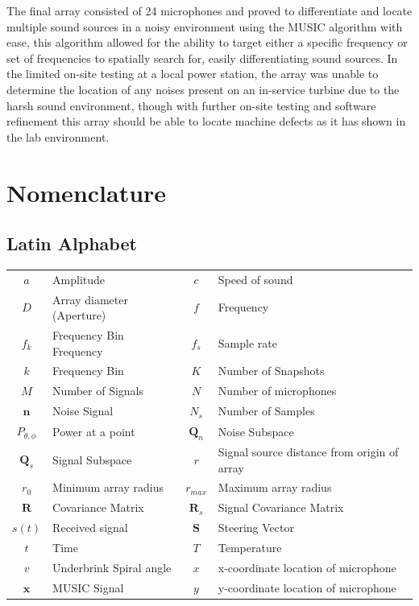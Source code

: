 \documentclass{UoNMCHA}
\numberwithin{equation}{section}
\begin{document}
    The final array consisted of 24 microphones and proved to differentiate and locate multiple sound sources in a noisy environment using the MUSIC algorithm with ease, this algorithm allowed for the ability to target either a specific frequency or set of frequencies to spatially search for, easily differentiating sound sources. In the limited on-site testing at a local power station, the array was unable to determine the location of any noises present on an in-service turbine due to the harsh sound environment, though with further on-site testing and software refinement this array should be able to locate machine defects as it has shown in the lab environment.

\singlespacing
\newpage
\tableofcontents
\newpage
\listoftables
\listoffigures
\newpage
\section*{Nomenclature}
\subsection*{Latin Alphabet}
    \begin{table}[H]
        \begin{tabular}{clcl}
            $a$&Amplitude&$c$&Speed of sound\\
            $D$&Array diameter (Aperture)&$f$&Frequency\\
            $f_k$&Frequency Bin Frequency&$f_s$&Sample rate\\
            $k$&Frequency Bin&$K$&Number of Snapshots\\
            $M$&Number of Signals&$N$&Number of microphones\\
            $\mathbf{n}$&Noise Signal&$N_s$&Number of Samples\\
            $P_{\theta,\phi}$&Power at a point&$\mathbf{Q}_n$&Noise Subspace\\
            $\mathbf{Q}_s$&Signal Subspace&$r$&Signal source distance from origin of array\\
            $r_0$&Minimum array radius&$r_{max}$&Maximum array radius\\
            $\mathbf{R}$&Covariance Matrix&$\mathbf{R}_s$&Signal Covariance Matrix\\
            $s(t)$&Received signal&$\mathbf{S}$&Steering Vector\\
            $t$&Time&$T$&Temperature\\
            $v$&Underbrink Spiral angle&$x$&x-coordinate location of microphone\\
            $\mathbf{x}$&MUSIC Signal&$y$&y-coordinate location of microphone
        \end{tabular}
    \end{table}
\end{document}
